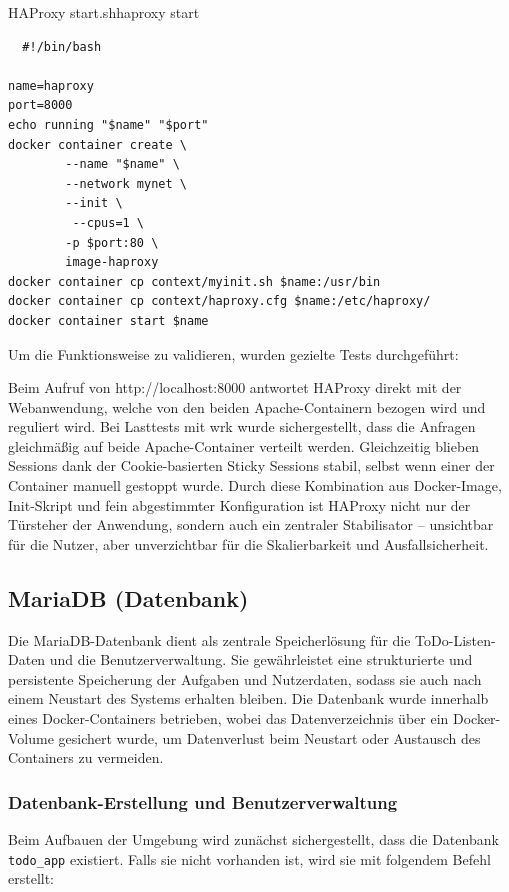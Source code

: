 \begin{code}{HAProxy start.sh}{haproxy start}
        \begin{verbatim}
  #!/bin/bash

name=haproxy
port=8000
echo running "$name" "$port"
docker container create \
        --name "$name" \
        --network mynet \
        --init \
         --cpus=1 \
        -p $port:80 \
        image-haproxy
docker container cp context/myinit.sh $name:/usr/bin
docker container cp context/haproxy.cfg $name:/etc/haproxy/
docker container start $name
        \end{verbatim}
\end{code}

Um die Funktionsweise zu validieren, wurden gezielte Tests durchgeführt:  

Beim Aufruf von http://localhost:8000 antwortet HAProxy direkt mit der Webanwendung, welche von den beiden Apache-Containern bezogen wird und reguliert wird. Bei Lasttests mit wrk wurde sichergestellt, dass die Anfragen gleichmäßig auf beide Apache-Container verteilt werden. Gleichzeitig blieben Sessions dank der Cookie-basierten Sticky Sessions stabil, selbst wenn einer der Container manuell gestoppt wurde. Durch diese Kombination aus Docker-Image, Init-Skript und fein abgestimmter Konfiguration ist HAProxy nicht nur der Türsteher der Anwendung, sondern auch ein zentraler Stabilisator – unsichtbar für die Nutzer, aber unverzichtbar für die Skalierbarkeit und Ausfallsicherheit. 



\subsection{MariaDB (Datenbank)}
Die MariaDB-Datenbank dient als zentrale Speicherlösung für die ToDo-Listen-Daten und die Benutzerverwaltung. Sie gewährleistet eine strukturierte und persistente Speicherung der Aufgaben und Nutzerdaten, sodass sie auch nach einem Neustart des Systems erhalten bleiben. Die Datenbank wurde innerhalb eines Docker-Containers betrieben, wobei das Datenverzeichnis über ein Docker-Volume gesichert wurde, um Datenverlust beim Neustart oder Austausch des Containers zu vermeiden.


\subsubsection{Datenbank-Erstellung und Benutzerverwaltung}
Beim Aufbauen der Umgebung wird zunächst sichergestellt, dass die Datenbank \texttt{todo\_app} existiert. Falls sie nicht vorhanden ist, wird sie mit folgendem Befehl erstellt:

